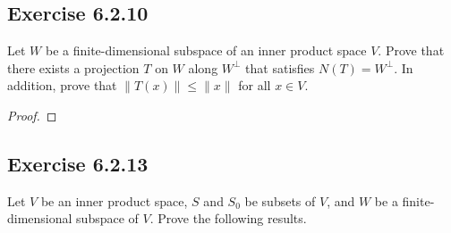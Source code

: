 \subsection*{Exercise 6.2.10} Let \( W  \) be a finite-dimensional subspace of an inner product space \( V  \). Prove that there exists a projection \( T  \) on \( W  \) along \( W^{\perp} \) that satisfies \( N(T) = W^{\perp} \). In addition, prove that \( \|T(x)\| \leq \|x\| \) for all \( x \in V  \).
\begin{proof}

\end{proof}

\subsection*{Exercise 6.2.13} Let \( V  \) be an inner product space, \( S  \) and \( {S}_{0} \) be subsets of \( V  \), and \( W  \) be a finite-dimensional subspace of \( V  \). Prove the following results.
